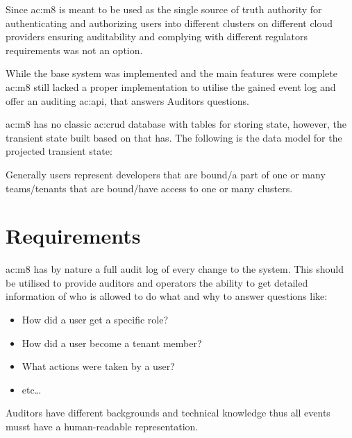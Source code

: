 Since \gls{ac:m8} is meant to be used as the single source of truth authority for authenticating and authorizing users into different clusters on different cloud providers ensuring auditability and complying with different regulators requirements was not an option.

While the base system was implemented and the main features were complete \gls{ac:m8} still lacked a proper implementation to utilise the gained event log and offer an auditing \gls{ac:api}, that answers Auditors questions.


\Gls{ac:m8} has no classic \acrshort{ac:crud} database with tables for storing state, however, the transient state built based on that has. The following is the data model for the projected transient state:


Generally users represent developers that are bound/a part of one or many teams/tenants that are bound/have access to one or many clusters.

\section{Requirements}

\Gls{ac:m8} has by nature a full audit log of every change to the system. This should be utilised to provide auditors and operators the ability to get detailed information of who is allowed to do what and why to answer questions like:

\begin{itemize}
  \item How did a user get a specific role?
  \item How did a user become a tenant member?
  \item What actions were taken by a user?
  \item etc\dots
\end{itemize}

Auditors have different backgrounds and technical knowledge thus all events musst have a human-readable representation.

